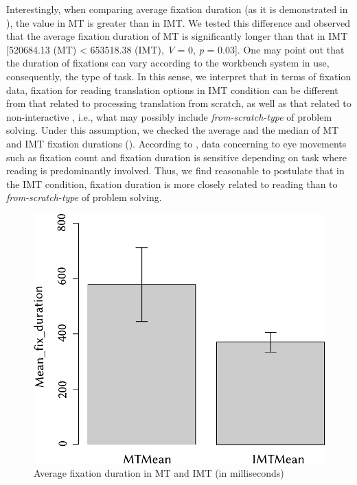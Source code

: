 \documentclass[output=paper]{langsci/langscibook}
\begin{document}
Interestingly, when comparing average fixation duration (as it is demonstrated in ), the value in MT is greater than in IMT. We tested this difference and observed that the average fixation duration of MT is significantly longer than that in IMT [520684.13 (MT) < 653518.38 (IMT), \textit{V} = 0, \textit{p} = 0.03]. One may point out that the duration of fixations can vary according to the workbench system in use, consequently, the type of  task. In this sense, we interpret that in terms of fixation data, fixation for reading translation options in IMT condition can be different from that related to processing translation from scratch, as well as that related to non-interactive , i.e., what may possibly include \textit{from-scratch-type} of problem solving. Under this assumption, we checked the average and the median of MT and IMT fixation durations (). According to \citet{jakobsen2008}, data concerning to eye movements such as fixation count and fixation duration is sensitive depending on task where reading is predominantly involved. Thus, we find reasonable to postulate that in the IMT condition, fixation duration is more closely related to reading than to \textit{from-scratch-type} of problem solving. 



\begin{figure}
 \includegraphics[width=.6\textwidth]{figures/Alves7_neu.pdf} 
 \caption{Average fixation duration in MT and IMT (in milliseconds)}
 \label{sarto:fig:7}
\end{figure} 
\end{document}
